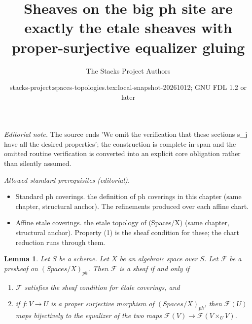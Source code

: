 \documentclass{stacks-project}
\title{Sheaves on the big ph site are exactly the etale sheaves with proper-surjective equalizer gluing}
\author{The Stacks Project Authors}
\date{stacks-project:spaces-topologies.tex:local-snapshot-20261012; GNU FDL 1.2 or later}
\theoremstyle{plain}
\newtheorem{lemma}[subsection]{Lemma}
\theoremstyle{definition}
\theoremstyle{remark}
\numberwithin{equation}{subsection}
\begin{document}
\maketitle
\noindent\textit{Editorial note.} The source ends 'We omit the verification that these sections s\_j have all the desired properties'; the construction is complete in-span and the omitted routine verification is converted into an explicit core obligation rather than silently assumed.\par\medskip
\noindent\textit{Allowed standard prerequisites (editorial).}\begin{itemize}
\item Standard ph coverings. the definition of ph coverings in this chapter (same chapter, structural anchor). The refinements produced over each affine chart.
\item Affine etale coverings. the etale topology of (Spaces/X) (same chapter, structural anchor). Property (1) is the sheaf condition for these; the chart reduction runs through them.
\end{itemize}\medskip
\begin{lemma}
\label{lemma-characterize-sheaf}
Let $S$ be a scheme. Let $X$ be an algebraic space over $S$.
Let $\mathcal{F}$ be a presheaf on $(\textit{Spaces}/X)_{ph}$.
Then $\mathcal{F}$ is a sheaf if and only if
\begin{enumerate}
\item $\mathcal{F}$ satisfies the sheaf condition for \'etale coverings, and
\item if $f : V \to U$ is a proper surjective morphism of
$(\textit{Spaces}/X)_{ph}$, then
$\mathcal{F}(U)$ maps bijectively to the equalizer
of the two maps $\mathcal{F}(V) \to \mathcal{F}(V \times_U V)$.
\end{enumerate}
\end{lemma}
\end{document}
